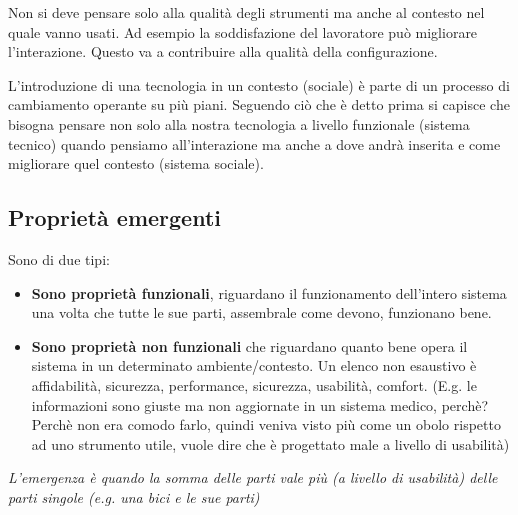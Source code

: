 \documentclass[11pt,a4paper]{book}
\begin{document}
Non si deve pensare solo alla qualità degli strumenti ma anche al contesto nel quale vanno usati. Ad esempio la soddisfazione del lavoratore può migliorare l'interazione. Questo va a contribuire alla qualità della configurazione. 

L'introduzione di una tecnologia in un contesto (sociale) è parte di un processo di cambiamento operante su più piani. Seguendo ciò che è detto prima si capisce che bisogna pensare non solo alla nostra tecnologia a livello funzionale (sistema tecnico) quando pensiamo all'interazione ma anche a dove andrà inserita e come migliorare quel contesto (sistema sociale).
 
\subsection{Proprietà emergenti}
Sono di due tipi:
\begin{itemize}
	\item \textbf{Sono proprietà funzionali}, riguardano il funzionamento dell'intero sistema una volta che tutte le sue parti, assembrale come devono, funzionano bene.
	\item \textbf{Sono proprietà non funzionali} che riguardano quanto bene opera il sistema in un determinato ambiente/contesto. Un elenco non esaustivo è affidabilità, sicurezza, performance, sicurezza, usabilità, comfort. (E.g. le informazioni sono giuste ma non aggiornate in un sistema medico, perchè? Perchè non era comodo farlo, quindi veniva visto più come un obolo rispetto ad uno strumento utile, vuole dire che è progettato male a livello di usabilità)
\end{itemize}

\begin{center}
	\textit{L'emergenza è quando la somma delle parti vale più (a livello di usabilità) delle parti singole (e.g. una bici e le sue parti)}
\end{center}
\end{document}
